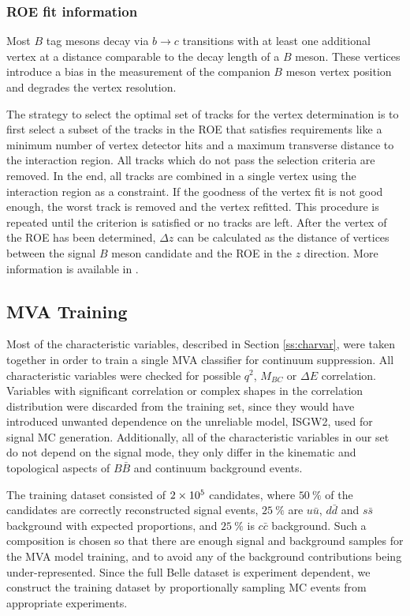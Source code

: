 \subsubsection{ROE fit information}

Most $B$ tag mesons decay via $b \to c$ transitions with at least one additional vertex at a distance comparable to the decay length of a $B$ meson. These vertices introduce a bias in the measurement of the companion $B$ meson vertex position and degrades the vertex resolution.

The strategy to select the optimal set of tracks for the vertex determination is to first select a subset of the tracks in the ROE that satisfies requirements like a minimum number of vertex detector hits and a maximum transverse distance to the interaction region. All tracks which do not pass the selection criteria are removed. In the end, all tracks are combined in a single vertex using the interaction region as a constraint. If the goodness of the vertex fit is not good enough, the worst track is removed and the vertex refitted. This procedure is repeated until the criterion is satisfied or no tracks are left. After the vertex of the ROE has been determined, $\Delta z$ can be calculated as the distance of vertices between the signal $B$ meson candidate and the ROE in the $z$ direction.
More information is available in \cite{bevan2014physics}.

\subsection{MVA Training}
\label{ss:qqmva}
Most of the characteristic variables, described in Section \ref{ss:charvar}, were taken together in order to train a single MVA classifier for continuum suppression. All characteristic variables were checked for possible $q^2$, $M_{BC}$ or $\Delta E$ correlation. Variables with significant correlation or complex shapes in the correlation distribution were discarded from the training set, since they would have introduced unwanted dependence on the unreliable model, ISGW2, used for signal MC generation. Additionally, all of the characteristic variables in our set do not depend on the signal mode, they only differ in the kinematic and topological aspects of $B \bar B$ and continuum background events.

The training dataset consisted of $2\times 10^{5}$ candidates, where $50~\%$ of the candidates are correctly reconstructed signal events, $25~\%$ are $u \bar u$, $d \bar d$ and $s \bar s$ background with expected proportions, and $25~\%$ is $c \bar c$ background. Such a composition is chosen so that there are enough signal and background samples for the MVA model training, and to avoid any of the background contributions being under-represented. Since the full Belle dataset is experiment dependent, we construct the training dataset by proportionally sampling MC events from appropriate experiments.

